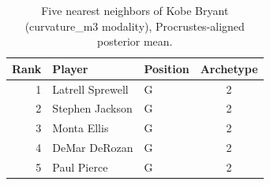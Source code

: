 \begin{table}[htbp]
  \centering\small
  \begin{tabular}{rllc}
    \toprule
    Rank & Player & Position & Archetype \\
    \midrule
    1 & Latrell Sprewell & G & 2 \\
    2 & Stephen Jackson & G & 2 \\
    3 & Monta Ellis & G & 2 \\
    4 & DeMar DeRozan & G & 2 \\
    5 & Paul Pierce & G & 2 \\
    \bottomrule
  \end{tabular}
  \caption{Five nearest neighbors of Kobe Bryant (curvature_m3 modality), Procrustes-aligned posterior mean.}
  \label{tab:Kobe_Bryant_neighbors_curvature_m3}
\end{table}

